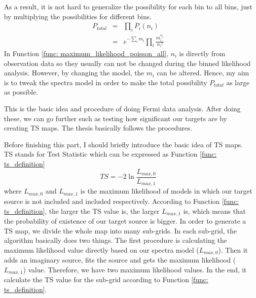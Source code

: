 \documentclass[12pt]{report}
\begin{document}
          As a result, it is not hard to generalize the possibility for each bin to all bins, just 
          by multiplying the possibilities for different bins.
          \begin{eqnarray}
            P_{total} &=& \prod_{i}^{}P_{i}\left(n_{i}\right) \nonumber \\ 
                      &=& e^{-\sum_{i}^{}m_i}\prod_{i}^{}\frac{m_{i}^{n_i}}{n_i!}
            \label{func: maximum_likelihood_poisson_all}
          \end{eqnarray}
          In Function \ref{func: maximum_likelihood_poisson_all}, $n_i$ is directly 
          from observation data so they usually can not be changed during the binned likelihood 
          analysis. However, by changing the model, the $m_i$ can be altered. 
          Hence, my aim is to tweak the spectra model in order to make the total possibility 
          $P_{total}$ as large as possible. 

          This is the basic idea and procedure of doing Fermi data analysis. After doing these,
          we can go further such as testing how significant our targets are by creating TS maps. The 
          thesis basically follows the procedures. 

          Before finishing this part, I should briefly introduce the basic idea of TS maps. 
          TS stands for Test Statistic which can be expressed as Function \ref{func: ts_definition}
          \begin{equation}
            TS = -2 \ln{\frac{L_{max,0}}{L_{max,1}}}
            \label{func: ts_definition}
          \end{equation}
          where $L_{max,0}$ and $L_{max,1}$ is the maximum likelihood of models in which our 
          target source is not included and included respectively. According to Function 
          \ref{func: ts_definition}, the larger the TS value is, the larger $L_{max, 1}$ is, which
          means that the probability of existence of our target source is bigger. 
          In order to generate a TS map, we divide the whole map into many sub-grids. In each sub-grid,
          the algorithm basically does two things. The first procedure is calculating the maximum likelihood 
          value
          directly based on our spectra model ($L_{max,0}$). Then it adds an imaginary source, fits the 
          source 
          and gets the maximum likelihood ($L_{max, 1}$) value. Therefore, we have two maximum likelihood 
          values.
          In the end, it calculate the TS value for the 
          sub-grid according to Function \ref{func: ts_definition}. 
\end{document}
